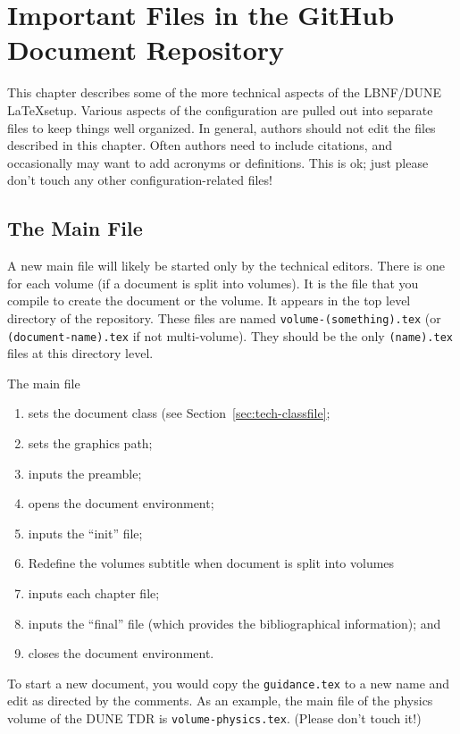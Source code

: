 \chapter{Important Files in the GitHub Document Repository}
\label{ch:tech}

This chapter describes some of the more technical aspects of the LBNF/DUNE \LaTeX setup. Various aspects of the configuration are pulled out into separate files to keep things well organized.  In general, authors should 
not edit the files described in this chapter. Often authors need to include citations, and occasionally may want to add acronyms or definitions. This is ok; just please don't touch any other configuration-related files!

\section{The Main File}
\label{sec:tech-mainfile}

A new main file will likely be started only by the technical editors. There is one for each volume (if a document is split into volumes). It is the file that you compile to create the document or the volume. It appears in the top level directory of the repository.  These files are named \texttt{volume-(something).tex} (or \texttt{(document-name).tex} if not multi-volume). They should be the only \texttt{(name).tex} files at this directory level.

The main file

\begin{enumerate}
\item sets the document class (see Section~\ref{sec:tech-classfile};
\item sets the graphics path;
\item inputs the preamble;
\item opens the document environment;
\item inputs the ``init'' file;
\item Redefine the volumes subtitle when document is split into volumes
\item inputs each chapter file;
\item inputs the ``final'' file (which provides the bibliographical information); and
\item closes the document environment.
\end{enumerate}

To start a new document, you would copy the \texttt{guidance.tex} to a new
name and edit as directed by the comments.  As an example, the main file of the physics volume of the DUNE TDR is \texttt{volume-physics.tex}. (Please don't touch it!) 



